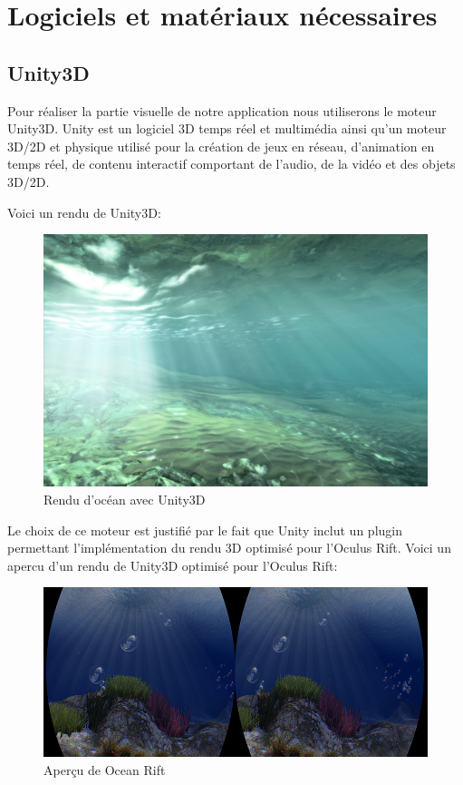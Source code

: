 \chapter{Logiciels et matériaux nécessaires}

\section{Unity3D}

Pour réaliser la partie visuelle de notre application nous utiliserons le moteur Unity3D. Unity est un logiciel 3D temps réel et multimédia ainsi qu'un moteur 3D/2D et physique utilisé pour la création de jeux en réseau, d'animation en temps réel, de contenu interactif comportant de l'audio, de la vidéo et des objets 3D/2D.

Voici un rendu de Unity3D:

\begin{figure}[!ht]
	\center	
	\includegraphics[scale=0.3]{image/unity.jpg}
	\caption{Rendu d'océan avec Unity3D}
\end{figure}

Le choix de ce moteur est justifié par le fait que Unity inclut un plugin \cite{1} permettant l’implémentation du rendu 3D optimisé pour l’Oculus Rift. Voici un apercu d’un rendu de Unity3D optimisé pour l’Oculus Rift:

\begin{figure}[!ht]
	\center	
	\includegraphics[scale=0.4]{image/unityoculus.jpg}
	\caption{Aperçu de Ocean Rift}
\end{figure}

